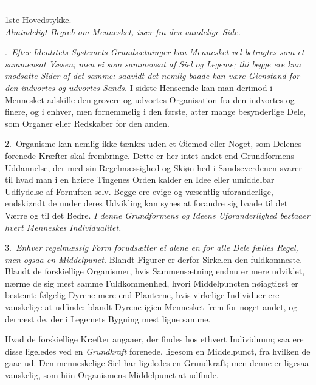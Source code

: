 \documentclass[12pt,a4paper]{article}
\newcommand{\hovedstykke}[2]{%
  \bigskip\begin{center}{\Large #1}\\[6pt]{\large \emph{#2}}\end{center}\smallskip}
\newcommand{\opage}[1]{\marginnote{\footnotesize\textit{[#1]}}}
\begin{document}
\begin{center}\rule{0.22\linewidth}{0.4pt}\end{center}


\hovedstykke{1ste Hovedstykke.}{Almindeligt Begreb om Mennesket, især fra den
aandelige Side.}


\opage{11} .~\emph{Efter Identitets Systemets Grundsætninger kan Mennesket vel betragtes
som et sammensat Væsen; men ei som sammensat af Siel og Legeme; thi begge ere kun
modsatte Sider af det samme: saavidt det nemlig baade kan være Gienstand for den
indvortes og udvortes Sands.} I sidste Henseende kan man derimod i Mennesket
adskille den grovere og udvortes Organisation fra den indvortes og finere, og i
enhver, men fornemmelig i den første, atter mange besynderlige Dele, som Organer
eller Redskaber for den anden.

2.~Organisme kan nemlig ikke tænkes uden et Øiemed eller Noget, som Delenes
forenede Kræfter skal frembringe. Dette er her intet andet end Grundformens
Uddannelse, der med sin Regelmæssighed og Skiøn%
\opage{12}hed i Sandseverdenen svarer til hvad man i en høiere Tingenes Orden kalder en
Idee eller umiddelbar Udflydelse af Fornuften selv. Begge ere evige og væsentlig
uforanderlige, endskiøndt de under deres Udvikling kan synes at forandre sig
baade til det Værre og til det Bedre. \emph{I denne Grundformens og Ideens
Uforanderlighed bestaaer hvert Menneskes Individualitet.}

3.~\emph{Enhver regelmæssig Form forudsætter ei alene en for alle Dele fælles
Regel, men ogsaa en Middelpunct.} Blandt Figurer er derfor Sirkelen den
fuldkomneste. Blandt de forskiellige Organismer, hvis Sammensætning endnu er mere
udviklet, nærme de sig mest samme Fuldkommenhed, hvori Middelpuncten nøiagtigst
er bestemt: følgelig Dyrene mere end Planterne, hvis virkelige Individuer ere
vanskelige at udfinde: blandt Dyrene igien Mennesket frem for noget andet, og
dernæst de, der i Legemets Bygning mest ligne samme.

Hvad de forskiellige Kræfter angaaer, der findes hos ethvert Individuum; saa ere
disse ligeledes ved en \emph{Grundkraft} forenede, ligesom en Middelpunct, fra
hvilken de gaae ud. Den menneskelige Siel har ligeledes en Grundkraft; men denne
er ligesaa vanskelig, som hiin Organismens Middelpunct at udfinde.
\end{document}
